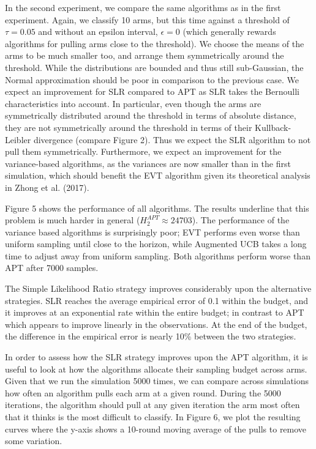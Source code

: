\documentclass[11pt,]{article}
\begin{document}
In the second experiment, we compare the same algorithms as in the first
experiment. Again, we classify 10 arms, but this time against a
threshold of \(\tau = 0.05\) and without an epsilon interval,
\(\epsilon = 0\) (which generally rewards algorithms for pulling arms
close to the threshold). We choose the means of the arms to be much
smaller too, and arrange them symmetrically around the threshold. While
the distributions are bounded and thus still sub-Gaussian, the Normal
approximation should be poor in comparison to the previous case. We
expect an improvement for SLR compared to APT as SLR takes the Bernoulli
characteristics into account. In particular, even though the arms are
symmetrically distributed around the threshold in terms of absolute
distance, they are not symmetrically around the threshold in terms of
their Kullback-Leibler divergence (compare Figure 2). Thus we expect the
SLR algorithm to not pull them symmetrically. Furthermore, we expect an
improvement for the variance-based algorithms, as the variances are now
smaller than in the first simulation, which should benefit the EVT
algorithm given its theoretical analysis in Zhong et al. (2017).

Figure 5 shows the performance of all algorithms. The results underline
that this problem is much harder in general
(\(H_2^{APT} \approx 24703\)). The performance of the variance based
algorithms is surprisingly poor; EVT performs even worse than uniform
sampling until close to the horizon, while Augmented UCB takes a long
time to adjust away from uniform sampling. Both algorithms perform worse
than APT after 7000 samples.

The Simple Likelihood Ratio strategy improves considerably upon the
alternative strategies. SLR reaches the average empirical error of 0.1
within the budget, and it improves at an exponential rate within the
entire budget; in contrast to APT which appears to improve linearly in
the observations. At the end of the budget, the difference in the
empirical error is nearly 10\% between the two strategies.

In order to assess how the SLR strategy improves upon the APT algorithm,
it is useful to look at how the algorithms allocate their sampling
budget across arms. Given that we run the simulation 5000 times, we can
compare across simulations how often an algorithm pulls each arm at a
given round. During the 5000 iterations, the algorithm should pull at
any given iteration the arm most often that it thinks is the most
difficult to classify. In Figure 6, we plot the resulting curves where
the y-axis shows a 10-round moving average of the pulls to remove some
variation.
\end{document}
